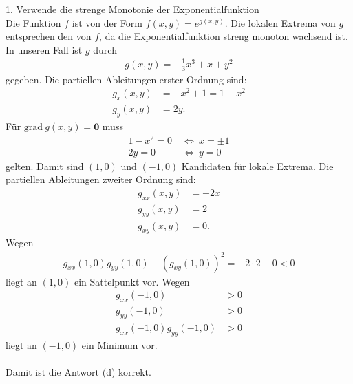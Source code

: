 \underline{1. Verwende die strenge Monotonie der Exponentialfunktion}\\
Die Funktion $ f $ ist von der Form $ f(x,y) = e^{g(x,y)} $.
Die lokalen Extrema von $ g $ entsprechen den von $ f $, da die Exponentialfunktion streng monoton wachsend ist.
In unseren Fall ist $ g $ durch
\begin{align*}
	g(x,y) 
	=
	-\frac{1}{3} x^3 + x +y^2  
\end{align*}
gegeben. Die partiellen Ableitungen erster Ordnung sind:
\begin{align*}
	g_x(x,y)
	&=
	-x^2 + 1 = 1 - x^2\\
	g_y(x,y)
	&=
	2 y.
\end{align*}
Für $ \mathrm{grad}\ g(x,y) = \textbf{0} $ muss
\begin{align*}
	1 - x^2 = 0 \ &\Leftrightarrow \ x = \pm 1\\
	2y = 0 \ &\Leftrightarrow \ y = 0
\end{align*}
gelten. Damit sind $ (1,0) $ und $ (-1,0) $ Kandidaten für lokale Extrema.
Die partiellen Ableitungen zweiter Ordnung sind:
\begin{align*}
	g_{xx }(x,y) &= -2x\\
	g_{yy}(x,y) &= 2\\
	g_{xy}(x,y) &= 0.
\end{align*}
Wegen 
\begin{align*}
	g_{xx }(1,0) g_{yy }(1,0) - (g_{xy }(1,0))^2
	=
	-2 \cdot 2 - 0 < 0
\end{align*}
liegt an $ (1,0) $ ein Sattelpunkt vor.
Wegen 
\begin{align*}
	g_{xx}(-1,0) &> 0 \\
	g_{yy}(-1,0) &> 0\\
	g_{xx}(-1,0) g_{yy}(-1,0) &> 0
\end{align*}
liegt an $ (-1,0) $ ein Minimum vor.\\
\\
Damit ist die Antwort (d) korrekt.


 
\newpage

